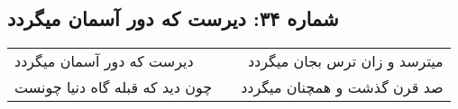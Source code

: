 \begin{center}
\section*{شماره ۳۴: دیرست که دور آسمان میگردد}
\label{sec:034}
\begin{longtable}{l p{0.5cm} r}
دیرست که دور آسمان میگردد
&&
میترسد و زان ترس بجان میگردد
\\
چون دید که قبله گاه دنیا چونست
&&
صد قرن گذشت و همچنان میگردد
\\
\end{longtable}
\end{center}
